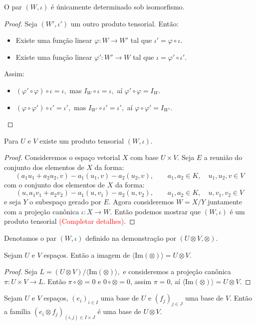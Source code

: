 \documentclass[11pt,twoside,a4paper]{book}
\begin{document}
\begin{proposicao}
O par $(W,\iota)$ é únicamente determinado sob isomorfismo.
\end{proposicao}
\begin{proof}
Seja $(W',\iota')$ um outro produto tensorial. Então:
\begin{itemize}
\item Existe uma função linear $\varphi:W\rightarrow W'$ tal que $\iota'=\varphi\circ\iota.$
\item Existe uma função linear $\varphi':W'\rightarrow W$ tal que $\iota=\varphi'\circ\iota'.$
\end{itemize}
Assim:
\begin{itemize}
\item $(\varphi'\circ\varphi)\circ\iota=\iota,$ mas $I_W\circ\iota=\iota,$ aí $\varphi'\circ\varphi=I_W.$
\item $(\varphi\circ\varphi')\circ\iota'=\iota',$ mas $I_{W'}\circ\iota'=\iota',$ aí $\varphi\circ\varphi'=I_{W'}.$
\end{itemize}
\end{proof}

\begin{proposicao}
Para $U$ e $V$ existe um produto tensorial $(W,\iota).$
\end{proposicao}
\begin{proof}
Consideremos o espaço vetorial $X$ com base $U\times V.$ Seja $E$ a reunião do conjunto dos elementos de $X$ da forma:
\[
(a_1u_1+a_2u_2,v)-a_1(u_1,v)-a_2(u_2,v),\quad\quad a_1,a_2\in K,\quad u_1,u_2,v\in V
\]
com o conjunto dos elementos de $X$ da forma:
\[
(u,a_1v_1+a_2v_2)-a_1(u,v_1)-a_2(u,v_2),\quad\quad a_1,a_2\in K,\quad u,v_1,v_2\in V
\]
e seja $Y$ o subespaço gerado por $E$. Agora consideremos $W=X/Y$ juntamente com a projeção canônica $\iota:X\rightarrow W.$ Então podemos mostrar que $(W,\iota)$ é um produto tensorial \textcolor{red}{(Completar detalhes)}.
\end{proof}

\begin{definicao}
Denotamos o par $(W,\iota)$ definido na demonstração por $(U\otimes V,\otimes).$
\end{definicao}

\begin{proposicao}
Sejam $U$ e $V$ espaços. Então a imagem de $\langle\mathrm{Im}(\otimes)\rangle=U\otimes V$.
\end{proposicao}
\begin{proof}
Seja $L=(U\otimes V)/\langle\mathrm{Im}(\otimes)\rangle,$ e consideremos a projeção canônica $\pi:U\times V\rightarrow L.$ Então $\pi\circ\otimes=0$ e $0\circ\otimes=0$, assim $\pi=0$, aí $\langle\mathrm{Im}(\otimes)\rangle=U\otimes V.$
\end{proof}

\begin{teorema}
Sejam $U$ e $V$ espaços, $(e_i)_{i\in I}$ uma base de $U$ e $(f_j)_{j\in J}$ uma base de $V.$ Então a família $(e_i\otimes f_j)_{(i,j)\in I\times J}$ é uma base de $U\otimes V.$
\end{teorema}

\printindex
\end{document}
